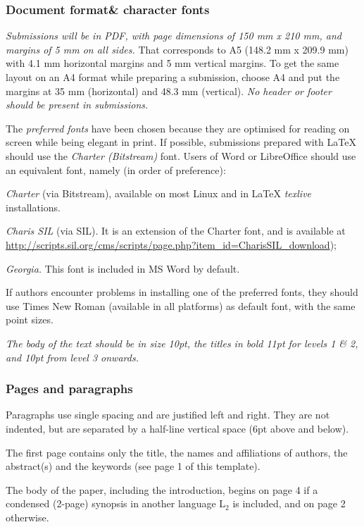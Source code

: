 \documentclass[10pt,a5paper,twoside]{article}
\begin{document}
\subsubsection{Document format\& character fonts}
\emph{Submissions will be in PDF, with page dimensions of 150 mm x 210 mm, and margins of 5 mm on all sides.} That corresponds to A5 (148.2 mm x 209.9 mm) with 4.1 mm horizontal margins and 5 mm vertical margins.  To get the same layout on an A4 format while preparing a submission, choose A4 and put the margins at 35 mm (horizontal) and 48.3 mm (vertical).
\newpage
\emph{No header or footer should be present in submissions.}

The \emph{preferred fonts} have been chosen because they are optimised for reading on screen while being elegant in print. If possible, submissions prepared with LaTeX should use the \emph{Charter (Bitstream)} font. Users of Word or LibreOffice should use an equivalent font, namely (in order of preference):
\begin{compactenum}
\item\emph{Charter} (via Bitstream), available on most Linux and in LaTeX \emph{texlive} installations.
\item\emph{Charis SIL} (via SIL). It is an extension of the Charter font, and is available at \href{http://scripts.sil.org/cms/scripts/page.php?item_id=CharisSIL_download}
{http://scripts.sil.org/cms/scripts/page.php?item\_id=CharisSIL\_download}); 
\item\emph{Georgia.} This font is included  in MS Word by default.
\end{compactenum} 
If authors encounter problems in installing one of the preferred fonts, they should use Times New Roman (available in all platforms) as default font, with the same point sizes.

\emph{The body of the text should be in size 10pt, the titles in bold 11pt for levels 1 \& 2, and 10pt from level 3 onwards.}
\subsubsection{Pages and paragraphs}
Paragraphs use single spacing and are justified left and right. They are not indented, but are separated by a half-line vertical space (6pt above and below).

The first page contains only the title, the names and affiliations of authors, the abstract(s) and the keywords (see page 1 of this template).

The body of the paper, including the introduction, begins on page 4 if a condensed (2-page) synopsis in another language L$_{2}$ is included, and on page 2 otherwise. 
\end{document}
